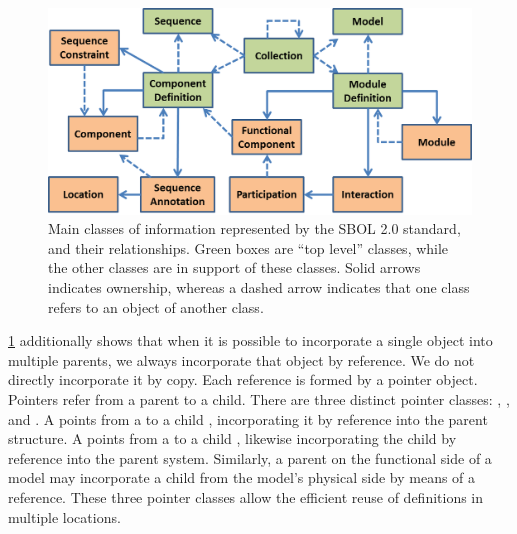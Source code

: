 \begin{figure}[ht]
\begin{center}
\includegraphics[scale=0.85]{images/OverviewFig2-v4.png}
\caption{Main classes of information represented by the SBOL 2.0 standard, and their relationships.  Green boxes are ``top level'' classes, while the other classes are in support of these classes. Solid arrows indicates ownership, whereas a dashed arrow indicates that one class refers to an object of another class.}
\label{images:overview2}
\end{center}
\end{figure}

\ref{images:overview2} additionally shows that when it is possible to incorporate a single object into multiple parents, we always incorporate that object by reference. We do not directly incorporate it by copy. Each reference is formed by a pointer object. Pointers refer from a parent to a child. There are three distinct pointer classes: , , and . A  points from a  to a child , incorporating it by reference into the parent structure. A  points from a  to a child , likewise incorporating the child by reference into the parent system. Similarly, a parent  on the functional side of a model may incorporate a child  from the model's physical side by means of a  reference. These three pointer classes allow the efficient reuse of definitions in multiple locations.

